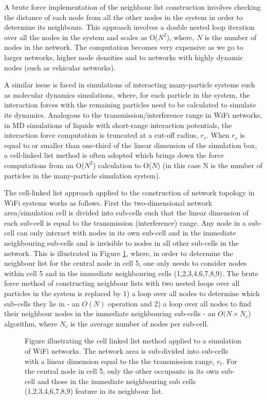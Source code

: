 \documentclass{elsart}
\begin{document}
A brute force implementation of the neighbour list construction involves 
checking the distance of each node from
all the other nodes in the system in order to determine its neighbours.
This approach involves a 
double nested loop iteration over all the nodes in the system and scales 
as O($N^2$), where, $N$ is the number of nodes in the network. The 
computation becomes very expensive as we 
go to larger networks, higher node densities and to networks with 
highly dynamic nodes (such as vehicular networks).

A similar issue is faced in simulations of interacting many-particle 
systems such as molecular dynamics simulations, where, 
for each particle in the system, the interaction forces with the remaining 
particles need  to be calculated to simulate its dynamics. Analogous to 
the transmission/interference range in WiFi networks, in MD simulations
of liquids with short-range interaction potentials, the interaction
force computation is truncated at a cut-off radius, $r_c$. When $r_c$ is 
equal to or smaller than one-third of the linear dimension of the 
simulation box, a cell-linked list method is often adopted
which brings down the force computations from an O($N^2$) calculation 
to O($N$) (in this case N is the number of particles in the many-particle 
simulation system). 

The cell-linked list approach \cite{allenandtildesley} applied to the 
construction of  network topology in WiFi systems works as follows.
First the two-dimensional network area/simulation 
cell is divided into sub-cells such that the linear dimension of each 
sub-cell is equal to the transmission (interference) range. 
Any node in a sub-cell 
can only interact with nodes in its own sub-cell and in the 
immediate neighbouring sub-cells and is invisible to nodes in all other 
sub-cells in the network. This is illustrated in Figure \ref{f:sys}, 
where, in order to determine the neighbour list for the central node in 
cell 5, one only needs to consider nodes  within cell 5 and in the 
immediate neighbouring cells (1,2,3,4,6,7,8,9). The brute force method of 
constructing neighbour lists with two nested loops over all particles in 
the system is replaced by 1) a loop over all nodes to determine which 
sub-cells they lie in - an $O(N)$ operation and 2) a loop over all nodes to find their neighbour nodes in the immediate neighbouring sub-cells - 
an $O(N\times N_c$) 
algorithm, where $N_c$ is the average number of nodes per sub-cell. 

\begin{figure}
\centering
{}
\caption{Figure illustrating the cell linked list method 
\cite{allenandtildesley} 
applied to a simulation of WiFi networks. The network
area is sub-divided into sub-cells with a linear dimension equal to the the 
transmission range, $r_t$. For the central node in cell 5, only the other 
occupants in its own sub-cell and those in the immediate neighbouring sub 
cells (1,2,3,4,6,7,8,9) feature in its neighbour list.}
\label{f:sys}
\end{figure}
\end{document}

